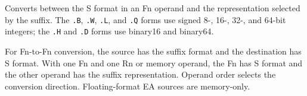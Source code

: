 Converts between the S format in an Fn operand and the representation selected by the suffix. The
\texttt{.B}, \texttt{.W}, \texttt{.L}, and \texttt{.Q} forms use signed 8-, 16-, 32-, and 64-bit integers;
the \texttt{.H} and \texttt{.D} forms use binary16 and binary64.

For Fn-to-Fn conversion, the source has the suffix format and the destination has S format. With one Fn and one
Rn or memory operand, the Fn has S format and the other operand has the suffix representation. Operand order
selects the conversion direction. Floating-format EA sources are memory-only.
